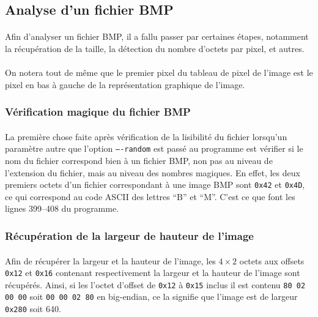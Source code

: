 \documentclass{report}
\begin{document}
\subsection{Analyse d'un fichier BMP}

\paragraph{} Afin d'analyser un fichier BMP, il a fallu passer par certaines
étapes, notamment la récupération de la taille, la détection du nombre d'octets
par pixel, et autres.

\paragraph{} On notera tout de même que le premier pixel du tableau de pixel de
l'image est le pixel en bas à gauche de la représentation graphique de l'image.

\subsubsection{Vérification magique du fichier BMP}

\paragraph{} La première chose faite après vérification de la lisibilité du
fichier lorsqu'un paramètre autre que l'option \texttt{----random} est passé au
programme est vérifier si le nom du fichier correspond bien à un fichier BMP,
non pas au niveau de l'extension du fichier, mais au niveau des nombres
magiques. En effet, les deux premiers octets d'un fichier correspondant à une
image BMP sont \texttt{0x42} et \texttt{0x4D}, ce qui correspond au code ASCII
des lettres ``B'' et ``M''. C'est ce que font les lignes 399--408 du programme.

\subsubsection{Récupération de la largeur de hauteur de l'image}

\paragraph{} Afin de récupérer la largeur et la hauteur de l'image, les
$4\times2$ octets aux offsets \texttt{0x12} et \texttt{0x16} contenant
respectivement la largeur et la hauteur de l'image sont récupérés. Ainsi, si
les l'octet d'offset de \texttt{0x12} à \texttt{0x15} inclus il est contenu
\texttt{80 02 00 00} soit \texttt{00 00 02 80} en big-endian, ce la signifie
que l'image est de largeur \texttt{0x280} soit 640.
\end{document}

